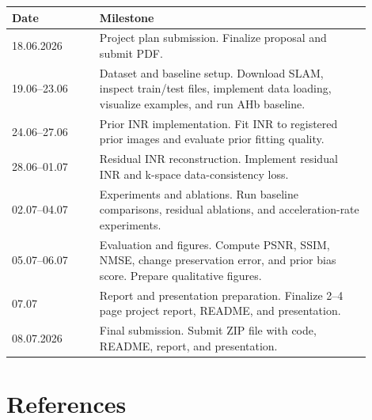 \documentclass[11pt,a4paper]{article}
\begin{document}
\begin{table}[h]
\centering
\begin{tabular}{p{0.22\linewidth}p{0.68\linewidth}}
\toprule
\textbf{Date} & \textbf{Milestone} \\
\midrule
18.06.2026 & Project plan submission. Finalize proposal and submit PDF. \\
19.06--23.06 & Dataset and baseline setup. Download SLAM, inspect train/test files, implement data loading, visualize examples, and run AHb baseline. \\
24.06--27.06 & Prior INR implementation. Fit INR to registered prior images and evaluate prior fitting quality. \\
28.06--01.07 & Residual INR reconstruction. Implement residual INR and k-space data-consistency loss. \\
02.07--04.07 & Experiments and ablations. Run baseline comparisons, residual ablations, and acceleration-rate experiments. \\
05.07--06.07 & Evaluation and figures. Compute PSNR, SSIM, NMSE, change preservation error, and prior bias score. Prepare qualitative figures. \\
07.07 & Report and presentation preparation. Finalize 2--4 page project report, README, and presentation. \\
08.07.2026 & Final submission. Submit ZIP file with code, README, report, and presentation. \\
\bottomrule
\end{tabular}
\end{table}

\section{References}
\end{document}
